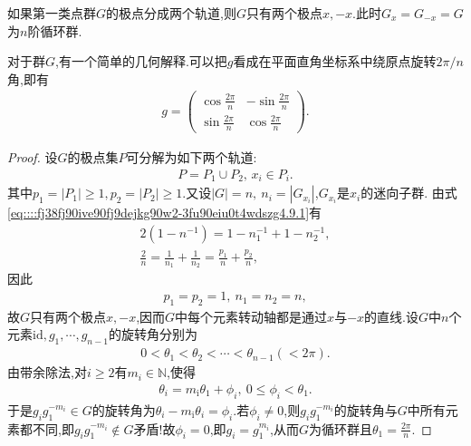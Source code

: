 \documentclass[../../main.tex]{subfiles}%
\begin{document}
\begin{theorem}
如果第一类点群$G$的极点分成两个轨道,则$G$只有两个极点$x,-x$.此时$G_x=G_{-x}=G$为$n$阶循环群.
\end{theorem}
\begin{remark}
对于群$G$,有一个简单的几何解释.可以把$g$看成在平面直角坐标系中绕原点旋转$2\pi/n$角,即有
\begin{align*}
g=\begin{pmatrix}
\cos\frac{2\pi}{n}&-\sin\frac{2\pi}{n}\\
\sin\frac{2\pi}{n}&\cos\frac{2\pi}{n}
\end{pmatrix}.
\end{align*}
\end{remark}
\begin{proof}
设$G$的极点集$P$可分解为如下两个轨道:
\begin{align*}
P=P_1\cup P_2,\,x_i\in P_i.
\end{align*}
其中$p_1=|P_1|\geqslant1,p_2=|P_2|\geqslant1$.又设$|G|=n,\ n_i=|G_{x_i}|$,$G_{x_i}$是$x_i$的迷向子群.
由式\eqref{eq::::fj38fj90ive90fj9dejkg90w2-3fu90eiu0t4wdszg4.9.1}有
\begin{align*}
2(1-n^{-1})=1-n_1^{-1}+1-n_2^{-1},\\
\frac{2}{n}=\frac{1}{n_1}+\frac{1}{n_2}=\frac{p_1}{n}+\frac{p_2}{n},
\end{align*}
因此
\begin{align*}
p_1=p_2=1,\ n_1=n_2=n,
\end{align*}
故$G$只有两个极点$x,-x$,因而$G$中每个元素转动轴都是通过$x$与$-x$的直线.设$G$中$n$个元素$\text{id},g_1,\cdots,g_{n-1}$的旋转角分别为
\begin{align*}
0<\theta_1<\theta_2<\cdots<\theta_{n-1}(<2\pi).
\end{align*}
由带余除法,对$i\geqslant 2$有$m_i\in\mathbb{N}$,使得
\begin{align*}
\theta_i=m_\mathrm{i}\theta _1+\phi_i,\ 0\leqslant\phi_i<\theta_1.
\end{align*}
于是$g_ig_1^{-m_i}\in G$的旋转角为$\theta_i-m_\mathrm{i}\theta _i=\phi_i$.若$\phi_i\neq 0$,则$g_ig_1^{-m_i}$的旋转角与$G$中所有元素都不同,即$g_ig_1^{-m_i}\notin G$矛盾!故$\phi_i=0$,即$g_i=g_1^{m_i}$,从而$G$为循环群且$\theta_1=\frac{2\pi}{n}$.
\end{proof}
\end{document}
